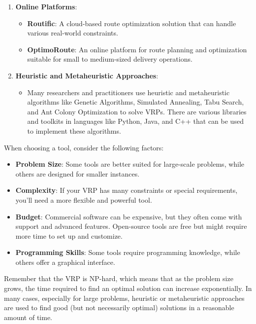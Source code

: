 \begin{enumerate}
    \item \textbf{Online Platforms}:
    \begin{itemize}
        \item \textbf{Routific}: A cloud-based route optimization solution that can handle various real-world constraints.
        \item \textbf{OptimoRoute}: An online platform for route planning and optimization suitable for small to medium-sized delivery operations.
    \end{itemize}
    
    \item \textbf{Heuristic and Metaheuristic Approaches}:
    \begin{itemize}
        \item Many researchers and practitioners use heuristic and metaheuristic algorithms like Genetic Algorithms, Simulated Annealing, Tabu Search, and Ant Colony Optimization to solve VRPs. There are various libraries and toolkits in languages like Python, Java, and C++ that can be used to implement these algorithms.
    \end{itemize}
\end{enumerate}

When choosing a tool, consider the following factors:
\begin{itemize}
    \item \textbf{Problem Size}: Some tools are better suited for large-scale problems, while others are designed for smaller instances.
    \item \textbf{Complexity}: If your VRP has many constraints or special requirements, you'll need a more flexible and powerful tool.
    \item \textbf{Budget}: Commercial software can be expensive, but they often come with support and advanced features. Open-source tools are free but might require more time to set up and customize.
    \item \textbf{Programming Skills}: Some tools require programming knowledge, while others offer a graphical interface.
\end{itemize}

Remember that the VRP is NP-hard, which means that as the problem size grows, the time required to find an optimal solution can increase exponentially. In many cases, especially for large problems, heuristic or metaheuristic approaches are used to find good (but not necessarily optimal) solutions in a reasonable amount of time.



